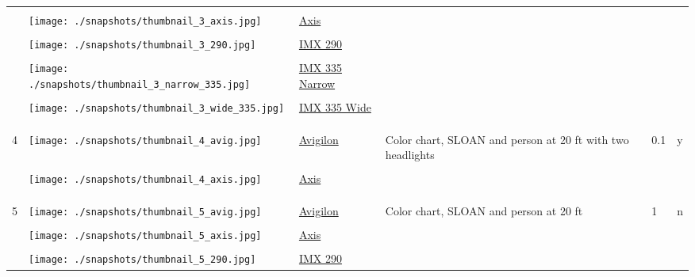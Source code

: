 \documentclass{article}%
\begin{document}
\begin{longtabu}{m{2.5cm} m{4cm} m{2cm} m{4cm} m{2cm} m{2cm}}
&&&&&\\%
&\texttt{[image: ./snapshots/thumbnail\_3\_axis.jpg]}&\href{https://drive.google.com/file/d/1Jv_5ABvKCxGoy3FBrwGth7CHPvijJzbC/view?usp=sharing}{Axis}&&&\\%
&&&&&\\%
&\texttt{[image: ./snapshots/thumbnail\_3\_290.jpg]}&\href{https://drive.google.com/file/d/12VL1gdjKlPqcwaDZMmox0JToHT8KDe5L/view?usp=sharing}{IMX 290}&&&\\%
&&&&&\\%
&\texttt{[image: ./snapshots/thumbnail\_3\_narrow\_335.jpg]}&\href{https://drive.google.com/file/d/1JtpyHYpi5WE-4bukV1eQRYKUVNGLHA9v/view?usp=sharing}{IMX 335 Narrow}&&&\\%
&&&&&\\%
&\texttt{[image: ./snapshots/thumbnail\_3\_wide\_335.jpg]}&\href{https://drive.google.com/file/d/1dWva5FP9_3fBOEda6hlaNBquHdUrAIYO/view?usp=sharing}{IMX 335 Wide}&&&\\%
&&&&&\\%
&&&&&\\%
\hline%
&&&&&\\%
4&\texttt{[image: ./snapshots/thumbnail\_4\_avig.jpg]}&\href{https://drive.google.com/file/d/1dzwAf_vjvnlZZigPS-tNTE3GUOtVdLHQ/view?usp=sharing}{Avigilon}&Color chart, SLOAN and person at 20 ft with two headlights&0.1&y\\%
&&&&&\\%
&\texttt{[image: ./snapshots/thumbnail\_4\_axis.jpg]}&\href{https://drive.google.com/file/d/1VykbA7uPZG0vlf5oge4vqfUiGAMm-ZEG/view?usp=sharing}{Axis}&&&\\%
&&&&&\\%
&&&&&\\%
\hline%
&&&&&\\%
5&\texttt{[image: ./snapshots/thumbnail\_5\_avig.jpg]}&\href{https://drive.google.com/file/d/1QjgfdstP6NkM28I8L67VvpeE0_j1vrTH/view?usp=sharing}{Avigilon}&Color chart, SLOAN and person at 20 ft&1&n\\%
&&&&&\\%
&\texttt{[image: ./snapshots/thumbnail\_5\_axis.jpg]}&\href{https://drive.google.com/file/d/1ZKxE8sKUDAM_w4QSf9a0iYzjH3_zque1/view?usp=sharing}{Axis}&&&\\%
&&&&&\\%
&\texttt{[image: ./snapshots/thumbnail\_5\_290.jpg]}&\href{https://drive.google.com/file/d/13uTJSzxMOpNTNiRlhc4r_q7YKX4gAzdr/view?usp=sharing}{IMX 290}&&&\\%

\end{longtabu}
\end{document}
